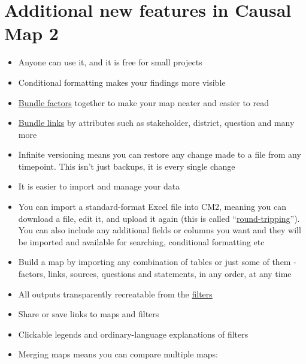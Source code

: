 \documentclass[
]{book}
\begin{document}
\hypertarget{additional-new-features-in-causal-map-2}{%
\section{Additional new features in Causal Map 2}\label{additional-new-features-in-causal-map-2}}

\begin{itemize}
\item
  Anyone can use it, and it is free for small projects
\item
  Conditional formatting makes your findings more visible
\item
  \protect\hyperlink{xbundlefactors}{Bundle factors} together to make your map neater and easier to read
\item
  \protect\hyperlink{bundlelinks}{Bundle links} by attributes such as stakeholder, district, question and many more
\item
  Infinite versioning means you can restore any change made to a file from any timepoint. This isn't just backups, it is every single change
\item
  It is easier to import and manage your data
\item
  You can import a standard-format Excel file into CM2, meaning you can download a file, edit it, and upload it again (this is called ``\protect\hyperlink{xroundtripping}{round-tripping}''). You can also include any additional fields or columns you want and they will be imported and available for searching, conditional formatting etc
\item
  Build a map by importing any combination of tables or just some of them - factors, links, sources, questions and statements, in any order, at any time
\item
  All outputs transparently recreatable from the \protect\hyperlink{advanced-editor}{filters}
\item
  Share or save links to maps and filters
\item
  Clickable legends and ordinary-language explanations of filters
\item
  Merging maps means you can compare multiple maps:


\end{itemize}
\end{document}
